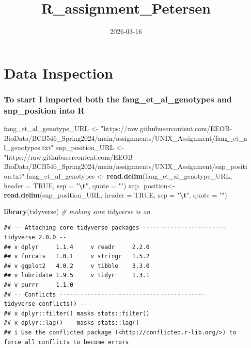\documentclass[
]{article}
\title{R\_assignment\_Petersen}
\author{}
\date{\vspace{-2.5em}2026-03-16}
\newenvironment{Shaded}{\begin{snugshade}}{\end{snugshade}}
\newcommand{\AttributeTok}[1]{\textcolor[rgb]{0.13,0.29,0.53}{#1}}
\newcommand{\CommentTok}[1]{\textcolor[rgb]{0.56,0.35,0.01}{\textit{#1}}}
\newcommand{\ConstantTok}[1]{\textcolor[rgb]{0.56,0.35,0.01}{#1}}
\newcommand{\FunctionTok}[1]{\textcolor[rgb]{0.13,0.29,0.53}{\textbf{#1}}}
\newcommand{\NormalTok}[1]{#1}
\newcommand{\OtherTok}[1]{\textcolor[rgb]{0.56,0.35,0.01}{#1}}
\newcommand{\SpecialCharTok}[1]{\textcolor[rgb]{0.81,0.36,0.00}{\textbf{#1}}}
\newcommand{\StringTok}[1]{\textcolor[rgb]{0.31,0.60,0.02}{#1}}
\begin{document}
\maketitle

\section{Data Inspection}\label{data-inspection}

\subsubsection{To start I imported both the fang\_et\_al\_genotypes and
snp\_position into
R}\label{to-start-i-imported-both-the-fang_et_al_genotypes-and-snp_position-into-r}

\begin{Shaded}
\begin{Highlighting}[]
\NormalTok{fang\_et\_al\_genotype\_URL }\OtherTok{\textless{}{-}} \StringTok{"https://raw.githubusercontent.com/EEOB{-}BioData/BCB546\_Spring2024/main/assignments/UNIX\_Assignment/fang\_et\_al\_genotypes.txt"}
\NormalTok{snp\_position\_URL }\OtherTok{\textless{}{-}}\StringTok{"https://raw.githubusercontent.com/EEOB{-}BioData/BCB546\_Spring2024/main/assignments/UNIX\_Assignment/snp\_position.txt"}
\NormalTok{fang\_et\_al\_genotypes }\OtherTok{\textless{}{-}} \FunctionTok{read.delim}\NormalTok{(fang\_et\_al\_genotype\_URL, }\AttributeTok{header =} \ConstantTok{TRUE}\NormalTok{, }\AttributeTok{sep =} \StringTok{"}\SpecialCharTok{\textbackslash{}t}\StringTok{"}\NormalTok{, }\AttributeTok{quote =} \StringTok{""}\NormalTok{)}
\NormalTok{snp\_position}\OtherTok{\textless{}{-}} \FunctionTok{read.delim}\NormalTok{(snp\_position\_URL, }\AttributeTok{header =} \ConstantTok{TRUE}\NormalTok{, }\AttributeTok{sep =} \StringTok{"}\SpecialCharTok{\textbackslash{}t}\StringTok{"}\NormalTok{, }\AttributeTok{quote =} \StringTok{""}\NormalTok{)}
\end{Highlighting}
\end{Shaded}

\begin{Shaded}
\begin{Highlighting}[]
\FunctionTok{library}\NormalTok{(tidyverse) }\CommentTok{\# making sure tidyverse is on}
\end{Highlighting}
\end{Shaded}

\begin{verbatim}
## -- Attaching core tidyverse packages ------------------------ tidyverse 2.0.0 --
## v dplyr     1.1.4     v readr     2.2.0
## v forcats   1.0.1     v stringr   1.5.2
## v ggplot2   4.0.2     v tibble    3.3.0
## v lubridate 1.9.5     v tidyr     1.3.1
## v purrr     1.1.0     
## -- Conflicts ------------------------------------------ tidyverse_conflicts() --
## x dplyr::filter() masks stats::filter()
## x dplyr::lag()    masks stats::lag()
## i Use the conflicted package (<http://conflicted.r-lib.org/>) to force all conflicts to become errors
\end{verbatim}
\end{document}
